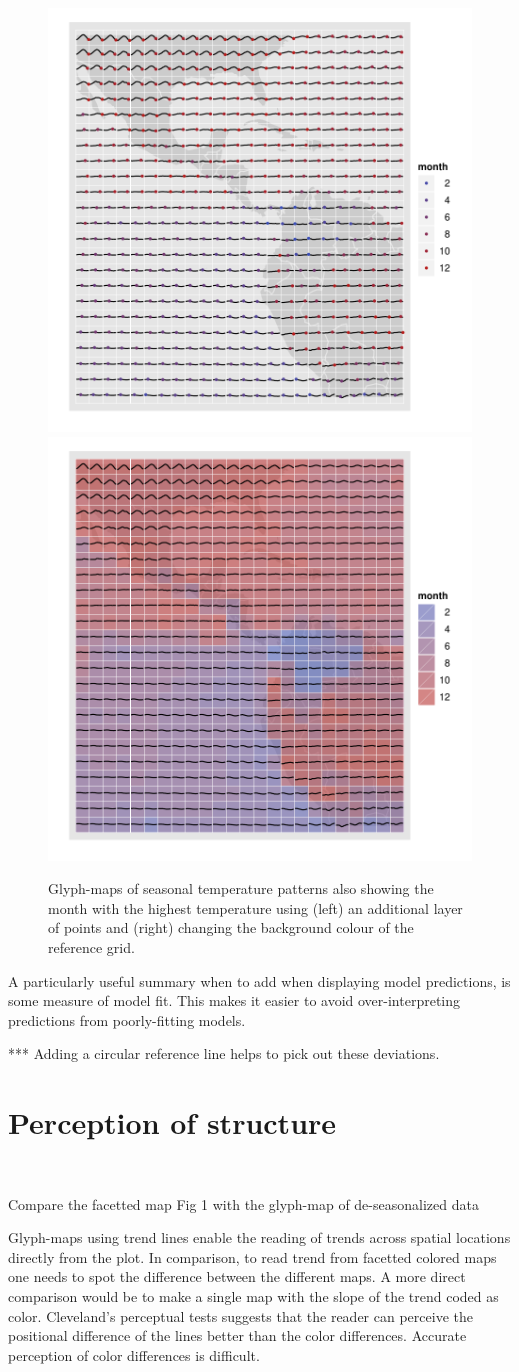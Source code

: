 \documentclass[oneside]{article}
\begin{document}
\begin{figure}[htbp]
  \centering
  \includegraphics[width=0.5\linewidth]{ref-max-1}%
  \includegraphics[width=0.5\linewidth]{ref-max-2}
  \caption{Glyph-maps of seasonal temperature patterns also showing the month with the highest temperature using (left) an additional layer of points and (right) changing the background colour of the reference grid.}
  \label{fig:ref-adv}
\end{figure}

A particularly useful summary when to add when displaying model predictions, is some measure of model fit. This makes it easier to avoid over-interpreting predictions from poorly-fitting models.


*** Adding a circular reference line helps to pick out these deviations.

\section{Perception of structure}~\label{sec:scale}

Compare the facetted map Fig 1 with the glyph-map of de-seasonalized data

Glyph-maps using trend lines enable the reading of trends across
spatial locations directly from the plot. In comparison, to read trend
from facetted colored maps one needs to spot the difference between
the different maps. A more direct comparison would be to make a single
map with the slope of the trend coded as color. Cleveland's
\citep{cleveland:1993a} perceptual tests suggests that the reader can
perceive the positional difference of the lines better than the color
differences. Accurate perception of color differences is difficult.
\end{document}
